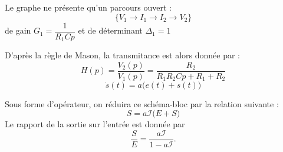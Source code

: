 Le graphe ne présente qu'un parcours ouvert :
\[
    \{V_1\rightarrow I_1\rightarrow I_2\rightarrow V_2\}
\]
de gain $G_1=\dfrac{1}{R_1Cp}$ et de déterminant $\Delta_1=1$

D'après la règle de Mason, la transmitance est alors donnée par :
\[
    H(p)=\dfrac{V_2(p)}{V_1(p)}=\dfrac{R_2}{R_1R_2Cp+ R_1+R_2}
\]
\clearpage
\[
    \dot{s}(t)=a\big(e(t)+s(t)\big)
\]
\begin{center}
    
\end{center}
Sous forme d'opérateur, on réduira ce schéma-bloc par 
la relation suivante :
\[
    S=a\mathcal{I}\big(E+S\big)
\]
Le rapport de la sortie sur l'entrée est donnée par
\[
    \dfrac{S}{E}=\dfrac{a\mathcal{I}}{1-a\mathcal{I}}.
\]
